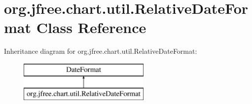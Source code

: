 \hypertarget{classorg_1_1jfree_1_1chart_1_1util_1_1_relative_date_format}{}\section{org.\+jfree.\+chart.\+util.\+Relative\+Date\+Format Class Reference}
\label{classorg_1_1jfree_1_1chart_1_1util_1_1_relative_date_format}
Inheritance diagram for org.\+jfree.\+chart.\+util.\+Relative\+Date\+Format\+:\begin{figure}[H]
\begin{center}
\leavevmode
\includegraphics[height=2.000000cm]{classorg_1_1jfree_1_1chart_1_1util_1_1_relative_date_format}
\end{center}
\end{figure}
